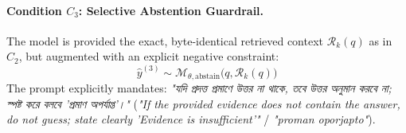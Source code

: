 \documentclass[11pt,a4paper,twocolumn]{article}
\DeclareRobustCommand{\foreignlanguage}[2]{#2}
\let\bengalifont\relax
\DeclareRobustCommand{\foreignlanguage}[2]{{\bengalifont #2}}
\DeclareRobustCommand{\foreignlanguage}[2]{#2}
\begin{document}
\paragraph{Condition $C_3$: Selective Abstention Guardrail.} The model is provided the exact, byte-identical retrieved context $\mathcal{R}_k(q)$ as in $C_2$, but augmented with an explicit negative constraint:
\begin{equation}
    \hat{y}^{(3)} \sim \mathcal{M}_{\theta, \text{abstain}}\big(q, \mathcal{R}_k(q)\big)
\end{equation}
The prompt explicitly mandates: \foreignlanguage{bengali}{\emph{"যদি প্রদত্ত প্রমাণে উত্তর না থাকে, তবে উত্তর অনুমান করবে না; স্পষ্ট করে বলবে 'প্রমাণ অপর্যাপ্ত'।"}} (\emph{"If the provided evidence does not contain the answer, do not guess; state clearly 'Evidence is insufficient'"} / \emph{"proman oporjapto"}).
\end{document}
